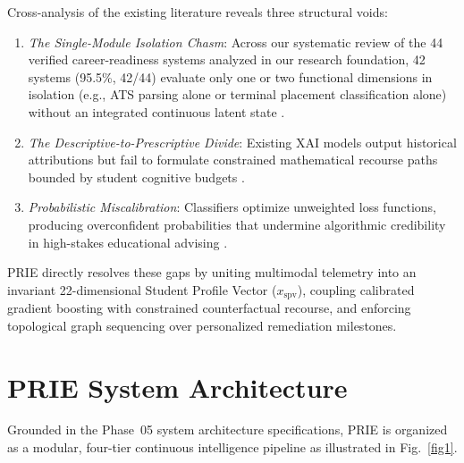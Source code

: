 \documentclass[conference]{IEEEtran}
\begin{document}
Cross-analysis of the existing literature reveals three structural voids:
\begin{enumerate}
\item \textit{The Single-Module Isolation Chasm}: Across our systematic review of the 44 verified career-readiness systems analyzed in our research foundation, 42 systems (95.5\%, 42/44) evaluate only one or two functional dimensions in isolation (e.g., ATS parsing alone or terminal placement classification alone) without an integrated continuous latent state \cite{b3,b6}.
\item \textit{The Descriptive-to-Prescriptive Divide}: Existing XAI models output historical attributions but fail to formulate constrained mathematical recourse paths bounded by student cognitive budgets \cite{b16,b17}.
\item \textit{Probabilistic Miscalibration}: Classifiers optimize unweighted loss functions, producing overconfident probabilities that undermine algorithmic credibility in high-stakes educational advising \cite{b8}.
\end{enumerate}

PRIE directly resolves these gaps by uniting multimodal telemetry into an invariant 22-dimensional Student Profile Vector ($x_{\text{spv}}$), coupling calibrated gradient boosting with constrained counterfactual recourse, and enforcing topological graph sequencing over personalized remediation milestones.

\section{PRIE System Architecture}

Grounded in the Phase~05 system architecture specifications, PRIE is organized as a modular, four-tier continuous intelligence pipeline as illustrated in Fig.~\ref{fig1}.
\end{document}
